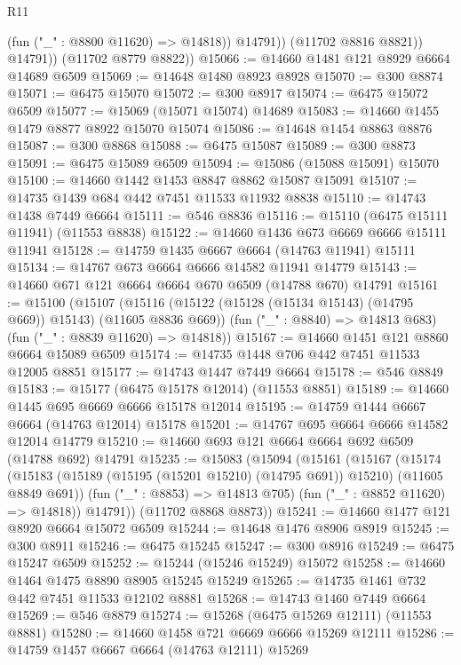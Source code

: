 \begin{lexlean}{R11}
\begin{coremodule}
                  (fun ("_" : @8800 @11620) => @14818))
                @14791))
            (@11702 @8816 @8821))
          @14791))
      (@11702 @8779 @8822))
@15066 := @14660 @1481 @121 @8929 @6664 @14689 @6509
@15069 := @14648 @1480 @8923 @8928
@15070 := @300 @8874
@15071 := @6475 @15070
@15072 := @300 @8917
@15074 := @6475 @15072 @6509
@15077 := @15069 (@15071 @15074) @14689
@15083 := @14660 @1455 @1479 @8877 @8922 @15070 @15074
@15086 := @14648 @1454 @8863 @8876
@15087 := @300 @8868
@15088 := @6475 @15087
@15089 := @300 @8873
@15091 := @6475 @15089 @6509
@15094 := @15086 (@15088 @15091) @15070
@15100 := @14660 @1442 @1453 @8847 @8862 @15087 @15091
@15107 := @14735 @1439 @684 @442 @7451 @11533 @11932 @8838
@15110 := @14743 @1438 @7449 @6664
@15111 := @546 @8836
@15116 := @15110 (@6475 @15111 @11941) (@11553 @8838)
@15122 := @14660 @1436 @673 @6669 @6666 @15111 @11941
@15128 := @14759 @1435 @6667 @6664 (@14763 @11941) @15111
@15134 := @14767 @673 @6664 @6666 @14582 @11941 @14779
@15143 := @14660 @671 @121 @6664 @6664 @670 @6509 (@14788 @670) @14791
@15161 := @15100
    (@15107
      (@15116 (@15122 (@15128 (@15134 @15143) (@14795 @669)) @15143) (@11605 @8836 @669))
      (fun ("_" : @8840) => @14813 @683)
      (fun ("_" : @8839 @11620) => @14818))
@15167 := @14660 @1451 @121 @8860 @6664 @15089 @6509
@15174 := @14735 @1448 @706 @442 @7451 @11533 @12005 @8851
@15177 := @14743 @1447 @7449 @6664
@15178 := @546 @8849
@15183 := @15177 (@6475 @15178 @12014) (@11553 @8851)
@15189 := @14660 @1445 @695 @6669 @6666 @15178 @12014
@15195 := @14759 @1444 @6667 @6664 (@14763 @12014) @15178
@15201 := @14767 @695 @6664 @6666 @14582 @12014 @14779
@15210 := @14660 @693 @121 @6664 @6664 @692 @6509 (@14788 @692) @14791
@15235 := @15083
    (@15094
      (@15161
        (@15167
          (@15174
            (@15183 (@15189 (@15195 (@15201 @15210) (@14795 @691)) @15210) (@11605 @8849 @691))
            (fun ("_" : @8853) => @14813 @705)
            (fun ("_" : @8852 @11620) => @14818))
          @14791))
      (@11702 @8868 @8873))
@15241 := @14660 @1477 @121 @8920 @6664 @15072 @6509
@15244 := @14648 @1476 @8906 @8919
@15245 := @300 @8911
@15246 := @6475 @15245
@15247 := @300 @8916
@15249 := @6475 @15247 @6509
@15252 := @15244 (@15246 @15249) @15072
@15258 := @14660 @1464 @1475 @8890 @8905 @15245 @15249
@15265 := @14735 @1461 @732 @442 @7451 @11533 @12102 @8881
@15268 := @14743 @1460 @7449 @6664
@15269 := @546 @8879
@15274 := @15268 (@6475 @15269 @12111) (@11553 @8881)
@15280 := @14660 @1458 @721 @6669 @6666 @15269 @12111
@15286 := @14759 @1457 @6667 @6664 (@14763 @12111) @15269

\end{coremodule}
\end{lexlean}
